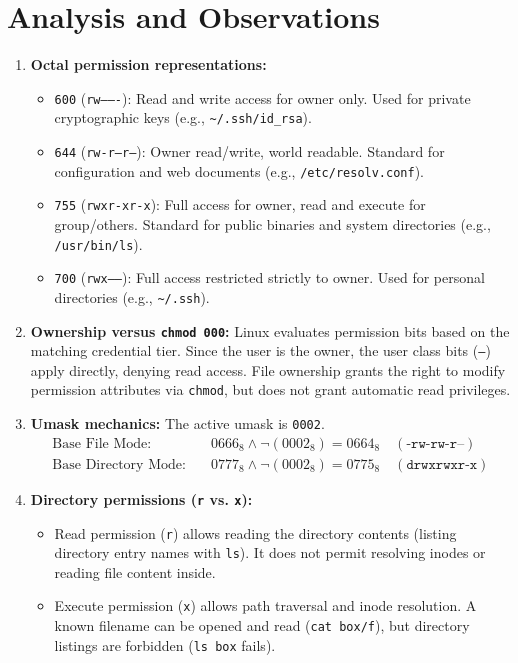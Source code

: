 \documentclass[12pt,a4paper]{report}
\numberwithin{equation}{chapter}
\numberwithin{figure}{chapter}
\numberwithin{table}{chapter}
\begin{document}
\section{Analysis and Observations}
\begin{enumerate}
    \item \textbf{Octal permission representations:}
    \begin{itemize}
        \item \texttt{600} (\texttt{rw-------}): Read and write access for owner only. Used for private cryptographic keys (e.g., \texttt{\textasciitilde/.ssh/id\_rsa}).
        \item \texttt{644} (\texttt{rw-r--r--}): Owner read/write, world readable. Standard for configuration and web documents (e.g., \texttt{/etc/resolv.conf}).
        \item \texttt{755} (\texttt{rwxr-xr-x}): Full access for owner, read and execute for group/others. Standard for public binaries and system directories (e.g., \texttt{/usr/bin/ls}).
        \item \texttt{700} (\texttt{rwx------}): Full access restricted strictly to owner. Used for personal directories (e.g., \texttt{\textasciitilde/.ssh}).
    \end{itemize}
    \item \textbf{Ownership versus \texttt{chmod 000}:} Linux evaluates permission bits based on the matching credential tier. Since the user is the owner, the user class bits (\texttt{---}) apply directly, denying read access. File ownership grants the right to modify permission attributes via \texttt{chmod}, but does not grant automatic read privileges.
    \item \textbf{Umask mechanics:} The active umask is \texttt{0002}.
    \begin{align*}
        \text{Base File Mode:} \quad & 0666_8 \land \neg(0002_8) = 0664_8 \quad (\texttt{-rw-rw-r--}) \\
        \text{Base Directory Mode:} \quad & 0777_8 \land \neg(0002_8) = 0775_8 \quad (\texttt{drwxrwxr-x})
    \end{align*}
    \item \textbf{Directory permissions (\texttt{r} vs. \texttt{x}):}
    \begin{itemize}
        \item Read permission (\texttt{r}) allows reading the directory contents (listing directory entry names with \texttt{ls}). It does not permit resolving inodes or reading file content inside.
        \item Execute permission (\texttt{x}) allows path traversal and inode resolution. A known filename can be opened and read (\texttt{cat box/f}), but directory listings are forbidden (\texttt{ls box} fails).

\end{itemize}
\end{enumerate}
\end{document}
